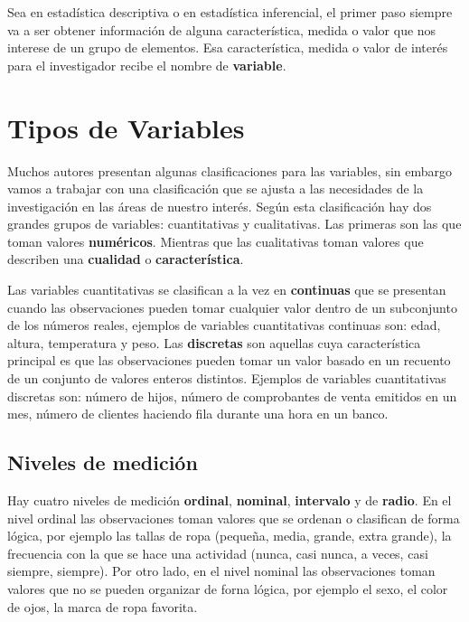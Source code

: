 \documentclass[]{book}
\begin{document}
Sea en estadística descriptiva o en estadística inferencial, el primer
paso siempre va a ser obtener información de alguna característica,
medida o valor que nos interese de un grupo de elementos. Esa
característica, medida o valor de interés para el investigador recibe el
nombre de \textbf{variable}.

\section{Tipos de Variables}\label{tipos-de-variables}

Muchos autores presentan algunas clasificaciones para las variables, sin
embargo vamos a trabajar con una clasificación que se ajusta a las
necesidades de la investigación en las áreas de nuestro interés. Según
esta clasificación hay dos grandes grupos de variables: cuantitativas y
cualitativas. Las primeras son las que toman valores \textbf{numéricos}.
Mientras que las cualitativas toman valores que describen una
\textbf{cualidad} o \textbf{característica}.

Las variables cuantitativas se clasifican a la vez en \textbf{continuas}
que se presentan cuando las observaciones pueden tomar cualquier valor
dentro de un subconjunto de los números reales, ejemplos de variables
cuantitativas continuas son: edad, altura, temperatura y peso. Las
\textbf{discretas} son aquellas cuya característica principal es que las
observaciones pueden tomar un valor basado en un recuento de un conjunto
de valores enteros distintos. Ejemplos de variables cuantitativas
discretas son: número de hijos, número de comprobantes de venta emitidos
en un mes, número de clientes haciendo fila durante una hora en un
banco.

\subsection{Niveles de medición}\label{niveles-de-medicion}

Hay cuatro niveles de medición \textbf{ordinal}, \textbf{nominal},
\textbf{intervalo} y de \textbf{radio}. En el nivel ordinal las
observaciones toman valores que se ordenan o clasifican de forma lógica,
por ejemplo las tallas de ropa (pequeña, media, grande, extra grande),
la frecuencia con la que se hace una actividad (nunca, casi nunca, a
veces, casi siempre, siempre). Por otro lado, en el nivel nominal las
observaciones toman valores que no se pueden organizar de forna lógica,
por ejemplo el sexo, el color de ojos, la marca de ropa favorita.
\end{document}
